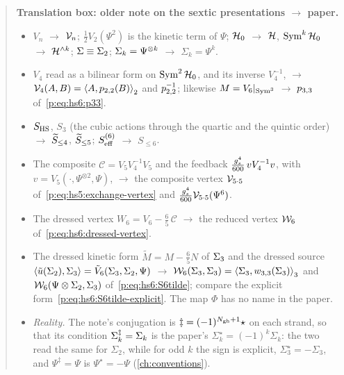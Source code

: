 \begin{quote}
  \small
  \textbf{Translation box: older note on the sextic presentations $\to$ paper.}
  \begin{itemize}
    \setlength{\itemsep}{0.3ex}
    \item $V_n$ $\to$ $\vertex{n}$; $\tfrac12 V_2(\Psi^2)$ is the kinetic term of $\Psi$; $\Hilb_0$ $\to$ $\Hs$, $\Sym^k \Hilb_0$ $\to$ $\Hn{k}$; $\Sig \equiv \Sig_2$; $\Sig_k = \Psi^{\otimes k}$ $\to$ $\Sigma_k = \Psi^k$.
    \item $V_4$ read as a bilinear form on $\Sym^2 \Hilb_0$, and its inverse $V_4^{-1}$, $\to$ $\vertex{4}(A, B) = \pair[2]{A}{\sprod{2}{2}(B)}$ and $\sprod{2}{2}^{-1}$; likewise $M = V_6 |_{\Sym^3}$ $\to$ $\sprod{3}{3}$ of~\eqref{p:eq:hs6:p33}.
    \item $S_{\rm HS}$, $S_3$ (the cubic actions through the quartic and the quintic order) $\to$ $\caction[\le 4]$, $\caction[\le 5]$; $S^{(6)}_{\rm eff}$ $\to$ $S_{\le 6}$.
    \item The composite $\mathcal C = V_5 V_4^{-1} V_5$ and the feedback $\tfrac{\gs^4}{600} \, v V_4^{-1} v$, with $v = V_5(\cdot, \Psi^{\otimes 2}, \Psi)$, $\to$ the composite vertex $\vertex{5 \cdot 5}$ of~\eqref{p:eq:hs5:exchange-vertex} and $\tfrac{\gs^4}{600} \vertex{5 \cdot 5}(\Psi^6)$.
    \item The dressed vertex $W_6 = V_6 - \tfrac65 \, \mathcal C$ $\to$ the reduced vertex $\dvertex{6}$ of~\eqref{p:eq:hs6:dressed-vertex}.
    \item The dressed kinetic form $\tilde M = M - \tfrac65 N$ of $\Sig_3$ and the dressed source $\Mean{\tilde u(\Sig_2), \Sig_3} = \tilde V_6(\Sig_3, \Sig_2, \Psi)$ $\to$ $\dvertex{6}(\Sigma_3, \Sigma_3) = \pair[3]{\Sigma_3}{\wprod{3}{3}(\Sigma_3)}$ and $\dvertex{6}(\Psi \otimes \Sigma_2, \Sigma_3)$ of~\eqref{p:eq:hs6:S6tilde}; compare the explicit form~\eqref{p:eq:hs6:S6tilde-explicit}. The map $\Phi$ has no name in the paper.
    \item \emph{Reality.} The note's conjugation is $\ddagger = (-1)^{\Ngh + 1} \star$ on each strand, so that its condition $\Sig_k^\ddagger = \Sig_k$ is the paper's $\Sigma_k^\star = (-1)^k \Sigma_k$: the two read the same for $\Sigma_2$, while for odd $k$ the sign is explicit, $\Sigma_3^\star = - \Sigma_3$, and $\Psi^\ddagger = \Psi$ is $\Psi^\star = - \Psi$ (\cref{ch:conventions}).
  \end{itemize}
\end{quote}



